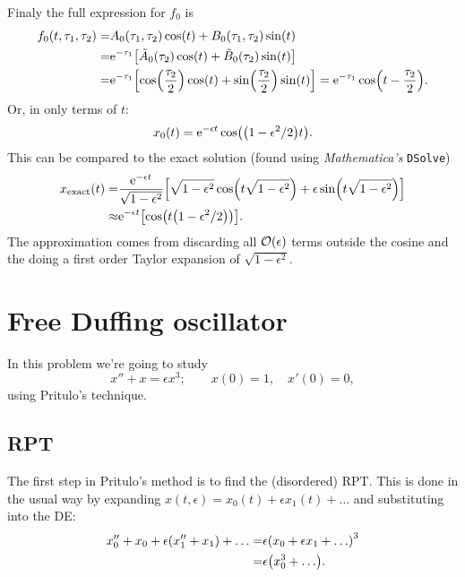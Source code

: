 \documentclass[11pt,letter, swedish, english
]{article}
\renewcommand{\thesubsection}{\arabic{section} (\alph{subsection})}
\begin{document}
Finaly the full expression for $f_0$ is
\begin{equation}
\begin{aligned}
f_0(t, \tau_1, \tau_2)=&A_0(\tau_1, \tau_2)\cos(t)+B_0(\tau_1, \tau_2)\sin(t)\\
=&\mathrm{e}^{-\tau_1}
\qty[\tilde{A}_0(\tau_2)\cos(t)+\tilde{B}_0(\tau_2)\sin(t)]\\
=&\mathrm{e}^{-\tau_1}
\qty[\cos(\frac{\tau_2}{2})\cos(t)+\sin(\frac{\tau_2}{2})\sin(t)]
=\mathrm{e}^{-\tau_1}\cos(t-\frac{\tau_2}{2}).
\end{aligned}
\end{equation}
Or, in only terms of $t$:
\begin{equation}
x_0(t)=\mathrm{e}^{-\epsilon t}\cos(\qty(1-\epsilon^2/2)t).
\end{equation}
This can be compared to the exact solution (found using
\textit{Mathematica's} \texttt{DSolve}) 
\begin{equation}
\begin{aligned}
x_\text{exact}(t)=&
\frac{\mathrm{e}^{-\epsilon t}}{\sqrt{1-\epsilon^2}} \qty[
\sqrt{1-\epsilon^2}\cos(t\sqrt{1-\epsilon^2})
+\epsilon\sin(t\sqrt{1-\epsilon^2})
]\\ \approx&
\mathrm{e}^{-\epsilon t}\qty[
\cos(t\qty(1-\epsilon^2/2))
].
\end{aligned}
\end{equation}
The approximation comes from discarding all $\order{\epsilon}$ terms
outside the cosine and the doing a first order Taylor expansion of
$\sqrt{1-\epsilon^2}$. 


\section{Free Duffing oscillator}
\renewcommand{\thesubsection}{\arabic{section} (\roman{subsection})}

In this problem we're going to study
\begin{equation}
x''+x=\epsilon {x}^3;\qquad
x(0)=1,\quad {x'}(0)=0,
\end{equation}
using Pritulo's technique.

\subsection{RPT}
The first step in Pritulo's method is to find the (disordered)
RPT. This is done in the usual way by expanding 
$x(t, \epsilon)=x_0(t)+\epsilon x_1(t)+\ldots$ and
substituting into the DE:
\begin{equation}
\begin{aligned}
x_0''+x_0 + \epsilon\qty(x_1''+x_1)
+\ldots
=&\epsilon\qty(x_0+\epsilon x_1+ \ldots)^3\\
=&\epsilon\qty(x_0^3+ \ldots).
\end{aligned}
\end{equation}
\end{document}
